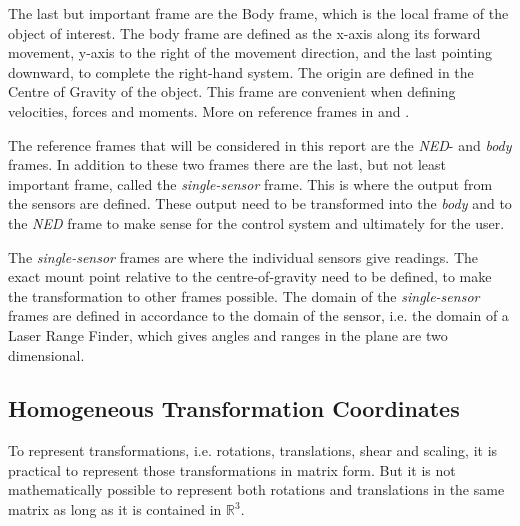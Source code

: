 	The last but important frame are the Body frame, which is the local frame of the object of interest.
	The body frame are defined as the x-axis along its forward movement, y-axis to the right of the
	movement direction, and the last pointing downward, to complete the right-hand system. The
	origin are defined in the Centre of Gravity of the object. This frame are convenient when
	defining velocities, forces and moments. More on reference frames in \cite{fossen} and
    \cite{forsell}.

    The reference frames that will be considered in this report are the \emph{NED}- and
    \emph{body} frames. In addition to these two frames there are the last, but not least
    important frame, called the \emph{single-sensor} frame. This is where the output from
    the sensors are defined. These output need to be transformed into the \emph{body} and
    to the \emph{NED} frame to make sense for the control system and ultimately for the
    user. 

    The \emph{single-sensor} frames are where the individual sensors give readings. The
    exact mount point relative to the centre-of-gravity need to be defined, to make the
    transformation to other frames possible. The domain of the \emph{single-sensor} frames
    are defined in accordance to the domain of the sensor, i.e. the domain of a Laser
    Range Finder, which gives angles and ranges in the plane are two dimensional. 


\subsection{Homogeneous Transformation Coordinates}
To represent transformations, i.e. rotations, translations, shear and scaling, it is
practical to represent those transformations in matrix form. But it is not mathematically
possible to represent both rotations and translations in the same matrix as long as it is
contained in $\mathbb{R}^3$. 

